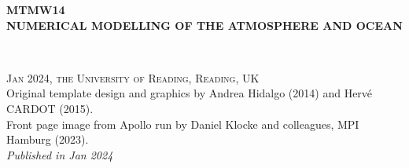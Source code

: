\documentclass[11pt,fleqn]{book} %
\begin{document}
	
	\let\cleardoublepage\clearpage
	
	
	\begingroup
	\thispagestyle{empty}
	\centering
	\vspace*{0cm}
	\par\normalfont\fontsize{30}{25}\sffamily\selectfont
	\textbf{MTMW14\\NUMERICAL MODELLING OF THE ATMOSPHERE AND OCEAN}\\
	{\LARGE }\par %
	\vspace*{1cm}
	{\color{white}{\Huge P.L. Vidale \\ January 2024}}\par %
	\endgroup
	
	
	\newpage
	~\vfill
	\thispagestyle{empty}
	
	
	\noindent \textsc{Jan 2024, the University of Reading, Reading, UK}\\
	
	\noindent Original template design and graphics by Andrea Hidalgo (2014) and Hervé CARDOT (2015).\\ %
	
	\noindent Front page image from Apollo run by Daniel Klocke and colleagues, MPI Hamburg (2023).\\ %
	
	\noindent \textit{Published in Jan 2024} %
	
	
	\pagestyle{empty} %
	
\end{document}

